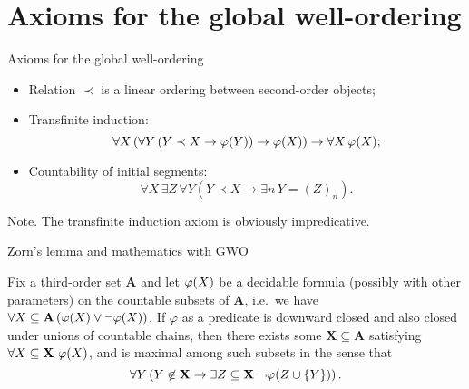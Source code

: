 \documentclass{beamer}
\begin{document}
\section[Global well-ordering]{Axioms for the global well-ordering}

\begin{frame}{Axioms for the global well-ordering}
  \begin{itemize}
    \item Relation $\prec$ is a linear ordering between second-order objects;

    \item Transfinite induction:
          \[\forall X \left(\forall Y \left(Y \prec X \rightarrow \varphi\mleft(Y\mright)\right) \rightarrow \varphi\mleft(X\mright)\right) \rightarrow \forall X \, \varphi\mleft(X\mright);\]

    \item Countability of initial segments:
          \[\forall X \, \exists Z \, \forall Y \left(Y \prec X \rightarrow \exists n \, Y = \left(Z\right)_n\right).\]
  \end{itemize}

  {\small { Note.} The transfinite induction axiom is obviously impredicative.}
\end{frame}

\begin{frame}{Zorn's lemma and mathematics with $\mathrm{GWO}$}
  \begin{theorem}
    \justifying
    Fix a third-order set $\mathbf{A}$ and let $\varphi\mleft(X\mright)$ be a decidable formula (possibly with other parameters) on the countable subsets of $\mathbf{A}$, i.e.\ we have $\forall X \subseteq \mathbf{A} \left(\varphi\mleft(X\mright) \lor \neg \varphi\mleft(X\mright)\right)$. If $\varphi$ as a predicate is downward closed and also closed under unions of countable chains, then there exists some $\mathbf{X} \subseteq \mathbf{A}$ satisfying $\forall X \subseteq \mathbf{X} \ \varphi\mleft(X\mright)$, and is maximal among such subsets in the sense that
    \[\forall Y \left(Y \not\in \mathbf{X} \rightarrow \exists Z \subseteq \mathbf{X} \ \neg \varphi\mleft(Z \cup \left\{Y\right\}\mright)\right).\]
  \end{theorem}
\end{frame}
\end{document}
